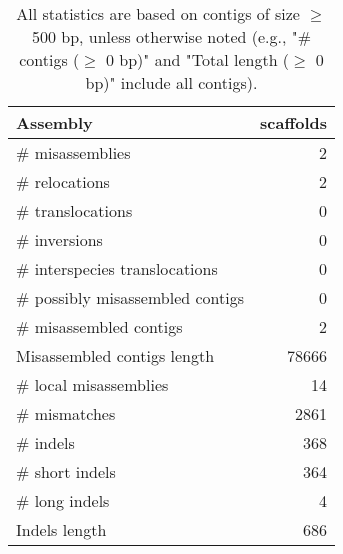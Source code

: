 \documentclass[12pt,a4paper]{article}
\begin{document}
\begin{table}[ht]
\begin{center}
\caption{All statistics are based on contigs of size $\geq$ 500 bp, unless otherwise noted (e.g., "\# contigs ($\geq$ 0 bp)" and "Total length ($\geq$ 0 bp)" include all contigs).}
\begin{tabular}{|l*{1}{|r}|}
\hline
Assembly & scaffolds \\ \hline
\# misassemblies & 2 \\ \hline
\hspace{5mm}\# relocations & 2 \\ \hline
\hspace{5mm}\# translocations & 0 \\ \hline
\hspace{5mm}\# inversions & 0 \\ \hline
\hspace{5mm}\# interspecies translocations & 0 \\ \hline
\# possibly misassembled contigs & 0 \\ \hline
\# misassembled contigs & 2 \\ \hline
Misassembled contigs length & 78666 \\ \hline
\# local misassemblies & 14 \\ \hline
\# mismatches & 2861 \\ \hline
\# indels & 368 \\ \hline
\hspace{5mm}\# short indels & 364 \\ \hline
\hspace{5mm}\# long indels & 4 \\ \hline
Indels length & 686 \\ \hline
\end{tabular}
\end{center}
\end{table}
\end{document}
